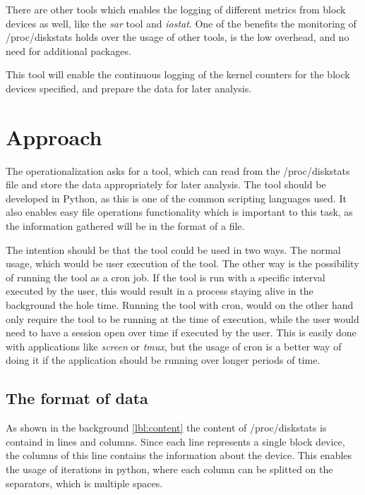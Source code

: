There are other tools which enables the logging of different metrics from block
devices as well, like the \textit{sar} tool and \textit{iostat}. One of the
benefits the monitoring of /proc/diskstats holds over the usage of other tools,
is the low overhead, and no need for additional packages.

This tool will enable the continuous logging of the kernel counters for the
block devices specified, and prepare the data for later analysis.

\section{Approach}

The operationalization asks for a tool, which can read from the /proc/diskstats
file and store the data appropriately for later analysis. The tool should be
developed in Python, as this is one of the common scripting languages used. It
also enables easy file operations functionality which is important to this
task, as the information gathered will be in the format of a file.

The intention should be that the tool could be used in two ways. The normal
usage, which would be user execution of the tool. The other way is the
possibility of running the tool as a cron job. If the tool is run with a
specific interval executed by the user, this would result in a process staying
alive in the background the hole time. Running the tool with cron, would on the
other hand only require the tool to be running at the time of execution, while
the user would need to have a session open over time if executed by the user.
This is easily done with applications like \textit{screen} or \textit{tmux},
but the usage of cron is a better way of doing it if the application should be
running over longer periods of time.

\subsection{The format of data}
As shown in the background \vref{lbl:content} the content of
/proc/diskstats is containd in lines and columns. Since each line represents a
single block device, the columns of this line contains the information about
the device. This enables the usage of iterations in python, where each column
can be splitted on the separators, which is multiple spaces.

